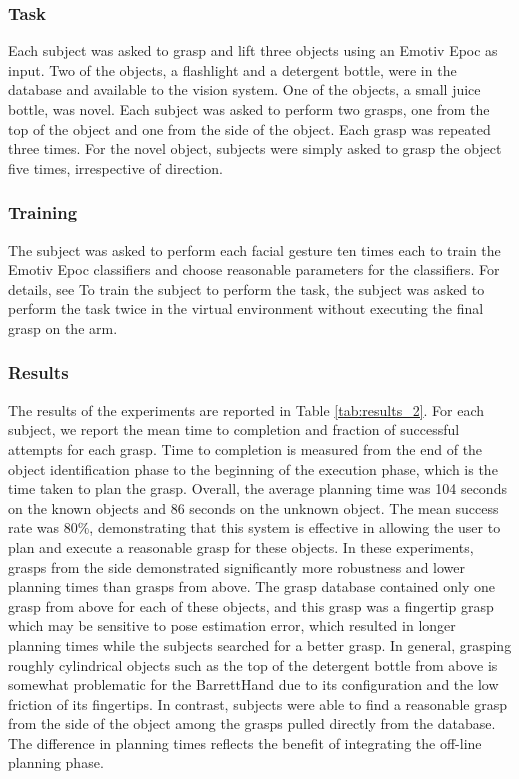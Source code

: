 \subsubsection{Task}
Each subject was asked to grasp and lift three objects using an Emotiv Epoc as input. Two of the objects, a flashlight and a detergent bottle, were in the database and available to the vision system. One of the objects, a small juice bottle, was novel. Each subject was asked to perform two grasps, one from the top of the object and one from the side of the object. Each grasp was repeated three times. For the novel object, subjects were simply asked to grasp the object five times, irrespective of direction.


\subsubsection{Training}
\label{sec:emotiv_training}
The subject was asked to perform each facial gesture ten times each to train the Emotiv Epoc classifiers and choose reasonable parameters for the classifiers. For details, see \cite{Weisz2013} To train the subject to perform the task, the subject was asked to perform the task twice in the virtual environment without executing the final grasp on the arm. 

\subsubsection{Results}
The results of the experiments are reported in Table \ref{tab:results_2}. For each subject, we report the mean time to completion and fraction of successful attempts for each grasp. Time to completion is measured from the end of the object identification phase to the beginning of the execution phase, which is the time taken to plan the grasp. Overall, the average planning time was 104 seconds on the known objects and 86 seconds on the unknown object. The mean success rate was 80\%, demonstrating that this system is effective in allowing the user to plan and execute a reasonable grasp for these objects.
In these experiments, grasps from the side demonstrated significantly more robustness and lower planning times than grasps from above. The grasp database contained only one grasp from above for each of these objects, and this grasp was a fingertip grasp which may be sensitive to pose estimation error, which resulted in longer planning times while the subjects searched for a better grasp. In general, grasping roughly cylindrical objects such as the top of the detergent bottle from above is somewhat problematic for the BarrettHand due to its configuration and the low friction of its fingertips. In contrast, subjects were able to find a reasonable grasp from the side of the object among the grasps pulled directly from the database. The difference in planning times reflects the benefit of integrating the off-line planning phase.

